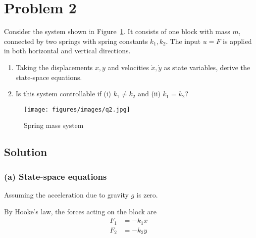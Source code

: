 \section*{Problem 2}

Consider the system shown in Figure~\ref{fig:q2}.
It consists of one block with mass \( m \), connected by two springs with spring constants \( k_{1}, k_{2} \).
The input \( u=F \) is applied in both horizontal and vertical directions.
\begin{enumerate}[label= (\alph*), topsep=3pt, itemsep=-0.2em]
    \item Taking the displacements \( x, y \) and velocities \( \dot{x}, \dot{y} \) as state variables, derive the state-space equations.
    \item Is this system controllable if (i) \( k_{1} \neq k_{2} \) and (ii) \( k_{1}=k_{2} \)?
\end{enumerate}
\begin{figure}[h]
    \centering
    \texttt{[image: figures/images/q2.jpg]}
    \caption{
        Spring mass system
    }\label{fig:q2}
\end{figure}
\vspace*{-2.5em}

\subsection*{Solution}

\subsubsection*{(a) State-space equations}

Assuming the acceleration due to gravity \( g \) is zero.

By Hooke's law, the forces acting on the block are
\begin{align*}
    F_{1}
     & = -k_{1}x
    \\
    F_{2}
     & = -k_{2}y
\end{align*}
